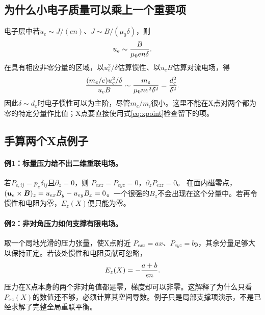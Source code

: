 \subsection{为什么小电子质量可以乘上一个重要项}
电子层中若$u_e\sim J/(en)$、$J\sim B/(\mu_0\delta)$，则
\begin{equation}
 u_e\sim {B\over\mu_0en\delta}.
\end{equation}
在具有相应非零分量的区域，以$u_e^2/\delta$估算惯性、以$u_eB$估算对流电场，得
\begin{equation}
 { (m_e/e)u_e^2/\delta\over u_eB}
 \sim{m_e\over\mu_0ne^2\delta^2}
 ={d_e^2\over\delta^2}.
\end{equation}
因此$\delta\sim d_e$时电子惯性可以为主阶，尽管$m_e/m_i$很小。这里不能在X点对两个都为零的特定分量作比值；X点要直接使用式\eqref{eq:xpoint}检查留下的项。

\subsection{手算两个X点例子}
\paragraph{例1：标量压力给不出二维重联电场。}
若$P_{e,ij}=p_e\delta_{ij}$且$\partial_z=0$，则
$P_{exz}=P_{eyz}=0$，$\partial_zP_{ezz}=0$。
在面内磁零点，$(\bm{u}_e\times\bm{B})_z=u_{ex}B_y-u_{ey}B_x=0$。一个很强的$B_z$不会出现在这个分量中。若再令惯性和电阻为零，$E_z(X)$便只能为零。

\paragraph{例2：非对角压力如何支撑有限电场。}
取一个局地光滑的压力张量，使X点附近
$P_{exz}=a x$、$P_{eyz}=b y$，其余分量足够大以保持正定。若该处惯性和电阻贡献可忽略，
\begin{equation}
 E_z(X)=-{a+b\over en}.
\end{equation}
压力在X点本身的两个非对角值都是零，梯度却可以非零。这解释了为什么只看$P_{xz}(X)$的数值还不够，必须计算其空间导数。例子只是局部支撑项演示，不是已经求解了完整全局重联平衡。
